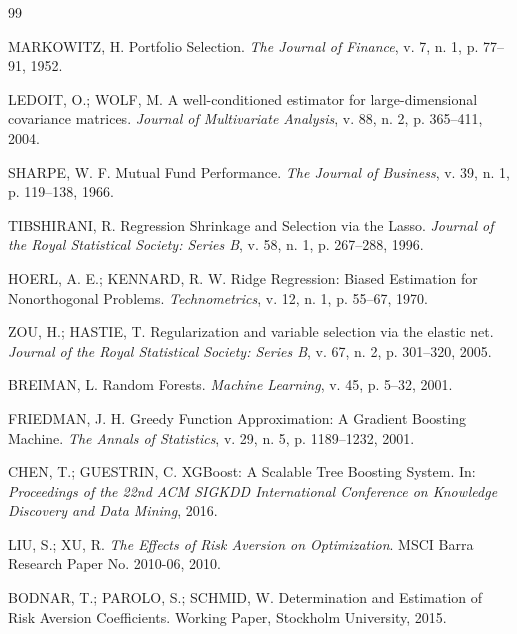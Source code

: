 \documentclass[12pt,a4paper]{article}
\begin{document}
\begin{thebibliography}{99}

MARKOWITZ, H. Portfolio Selection. \textit{The Journal of Finance}, v. 7, n. 1, p. 77--91, 1952.

LEDOIT, O.; WOLF, M. A well-conditioned estimator for large-dimensional covariance matrices. \textit{Journal of Multivariate Analysis}, v. 88, n. 2, p. 365--411, 2004.

SHARPE, W. F. Mutual Fund Performance. \textit{The Journal of Business}, v. 39, n. 1, p. 119--138, 1966.


TIBSHIRANI, R. Regression Shrinkage and Selection via the Lasso. \textit{Journal of the Royal Statistical Society: Series B}, v. 58, n. 1, p. 267--288, 1996.

HOERL, A. E.; KENNARD, R. W. Ridge Regression: Biased Estimation for Nonorthogonal Problems. \textit{Technometrics}, v. 12, n. 1, p. 55--67, 1970.

ZOU, H.; HASTIE, T. Regularization and variable selection via the elastic net. \textit{Journal of the Royal Statistical Society: Series B}, v. 67, n. 2, p. 301--320, 2005.

BREIMAN, L. Random Forests. \textit{Machine Learning}, v. 45, p. 5--32, 2001.

FRIEDMAN, J. H. Greedy Function Approximation: A Gradient Boosting Machine. \textit{The Annals of Statistics}, v. 29, n. 5, p. 1189--1232, 2001.

CHEN, T.; GUESTRIN, C. XGBoost: A Scalable Tree Boosting System. In: \textit{Proceedings of the 22nd ACM SIGKDD International Conference on Knowledge Discovery and Data Mining}, 2016.

LIU, S.; XU, R. \textit{The Effects of Risk Aversion on Optimization}. MSCI Barra Research Paper No. 2010-06, 2010.

BODNAR, T.; PAROLO, S.; SCHMID, W. Determination and Estimation of Risk Aversion Coefficients. Working Paper, Stockholm University, 2015.

\end{thebibliography}
\end{document}

